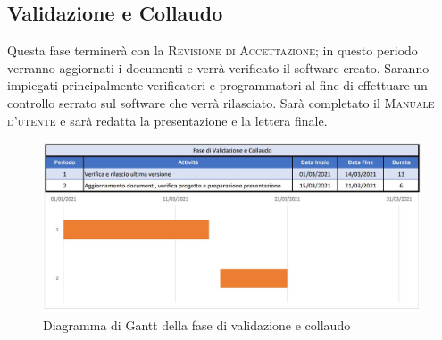 \documentclass[../piano_di_progetto.tex]{subfiles}
\begin{document}
\subsection{Validazione e Collaudo}%
\label{sub:valid_coll}
Questa fase terminerà con la \textsc{Revisione di Accettazione}; in questo periodo verranno aggiornati i documenti e verrà verificato il software creato. Saranno impiegati principalmente verificatori e programmatori al fine di effettuare un controllo serrato sul software che verrà rilasciato. Sarà completato il \textsc{Manuale d'utente} e sarà redatta la presentazione e la lettera finale. 

\begin{figure}[H]
\centering

\includegraphics[width=12cm]{componenti/img/fase_valid_collaudo}

\caption{Diagramma di Gantt della fase di validazione e collaudo}
\end{figure}
\end{document}
